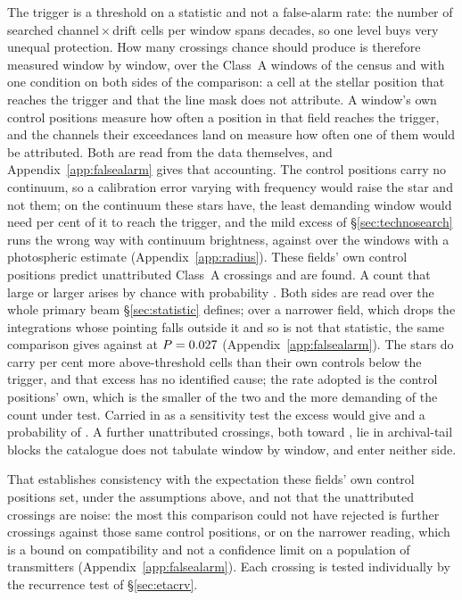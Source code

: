 The trigger is a threshold on a statistic and not a false-alarm rate: the
number of searched channel\,$\times$\,drift cells per window spans
\TuCellsDecades{} decades, so one level buys very unequal protection. How
many crossings chance should produce is therefore measured window by window,
over the \CeNWin{} Class~A windows of the census and with one condition on
both sides of the comparison: a cell at the stellar position that reaches the
trigger and that the line mask does not attribute. A window's own \NCtrl{} control positions measure how often a position in
that field reaches the trigger, and the channels their exceedances land on
measure how often one of them would be attributed. Both are read from the
data themselves, and Appendix~\ref{app:falsealarm} gives that accounting. The control positions carry no continuum, so a calibration error varying
with frequency would raise the star and not them; on the continuum these
stars have, the least demanding window would need
\CyEpsMinPct{} per cent of it to reach the trigger, and the mild excess of
\S\ref{sec:technosearch} runs the wrong way with continuum brightness,
\CkRatioContBright{} against \CkRatioContFaint{} over the \CkNContWin{}
windows with a photospheric estimate (Appendix~\ref{app:radius}). These fields' own control positions predict \CeExp{} unattributed
Class~A crossings and \CeObs{} are found. A count that large or larger arises
by chance with probability \CeProbNull. Both sides are read over the whole
primary beam \S\ref{sec:statistic} defines; over a narrower field, which
drops the integrations whose pointing falls outside it and so is not that
statistic, the same comparison gives \FrNarrowObs{} against \FrNarrowExp{}
at $P=0.027$ (Appendix~\ref{app:falsealarm}). The stars do carry \CeStepPct{} per cent
more above-threshold cells than their own controls below the trigger, and
that excess has no identified cause; the rate adopted is the control
positions' own, which is the smaller of the two and the more demanding of
the count under test. Carried in as a sensitivity test the excess would give
\CeExpX{} and a probability of \CeProbStep. A further \CeNTailCrossWord{} unattributed
crossings, both toward \CeTailStar, lie in archival-tail blocks the catalogue
does not tabulate window by window, and enter neither side.

That establishes consistency with the expectation these fields' own
control positions set, under the assumptions above, and not that the
unattributed crossings are noise: the most this comparison could not have
rejected is \CeAddLim{} further crossings against those same control
positions, or \FrNarrowAddLim{} on the narrower reading, which is a bound on
compatibility and not a confidence limit on a
population of transmitters (Appendix~\ref{app:falsealarm}). Each
crossing is tested individually by the recurrence test of
\S\ref{sec:etacrv}.

